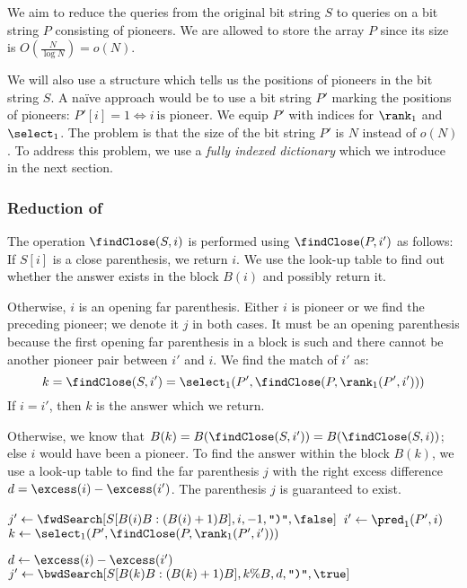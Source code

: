 \bigbreak

We aim to reduce the queries from the original bit string $S$ to queries on a bit string $P$ consisting of pioneers.
We are allowed to store the array $P$ since its size is $O(\frac{N}{\log N}) = o(N)$.

We will also use a structure which tells us the positions of pioneers in the bit string $S$.
A naïve approach would be to use a bit string $P'$ marking the positions of pioneers: $P'[i] = 1 \iff i\ \textrm{is pioneer}$. We equip $P'$ with indices for $\rank_1$ and $\select_1$.
The problem is that the size of the bit string $P'$ is $N$ instead of $o(N)$.
To address this problem, we use a \emph{fully indexed dictionary} which we introduce in the next section.

\subsubsection{Reduction of \findClose}

The operation $\findClose(S, i)$ is performed using $\findClose(P, i')$ as follows:
If $S[i]$ is a close parenthesis, we return $i$.
We use the look-up table to find out whether the answer exists in the block $B(i)$ and possibly return it.

Otherwise, $i$ is an opening far parenthesis.
Either $i$ is pioneer or we find the preceding pioneer; we denote it $j$ in both cases.
It must be an opening parenthesis because the first opening far parenthesis in a block is such and there cannot be another pioneer pair between $i'$ and $i$.
We find the match of $i'$ as:
$$ k = \findClose(S, i') = \select_1(P', \findClose(P, \rank_1(P', i'))) $$
If $i = i'$, then $k$ is the answer which we return.

Otherwise, we know that $B(k) = B(\findClose(S, i')) = B(\findClose(S, i))$; else $i$ would have been a pioneer.
To find the answer within the block $B(k)$, we use a look-up table \bwdSearch{} to find the far parenthesis $j$ with the right excess difference $d = \excess(i) - \excess(i')$.
The parenthesis $j$ is guaranteed to exist.

\begin{algorithm}
\begin{algorithmic}
		\State {}
	\Else
		\State $j' \gets \fwdSearch[S[B(i)B: (B(i) + 1)B], i, -1, \closingParen, \false]$
			\State {} 
		\Else
			\State $i' \gets \pred_1(P', i)$
			\State $k \gets \select_1(P', \findClose(P, \rank_1(P', i')))$ 

			\State $d \gets \excess(i) - \excess(i')$
			\State $j' \gets \bwdSearch[S[B(k)B: (B(k) + 1)B], k \% B, d, \closingParen, \true]$
			\State {}
		\EndIf
	\EndIf
\EndFunction
\end{algorithmic}
\end{algorithm}

